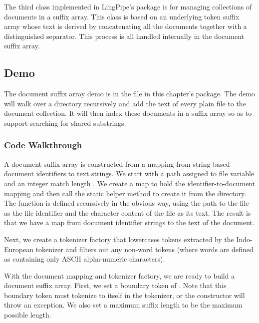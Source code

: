 The third class implemented in LingPipe's  package
is for managing collections of documents in a suffix array.  This
class is based on an underlying token suffix array whose text is
derived by concatenating all the documents together with a distinguished
separator.  This process is all handled internally in the document
suffix array.

\subsection{Demo}

The document suffix array demo is in the file 
in this chapter's package.  The demo will walk over a directory recursively
and add the text of every plain file to the document collection.  It
will then index these documents in a suffix array so as to support
searching for shared substrings.

\subsubsection{Code Walkthrough}

A document suffix array is constructed from a mapping from
string-based document identifiers to text strings.  We start
with a path assigned to file variable  and an integer
match length .  We create a map to hold the
identifier-to-document mapping and then call the static helper
method  to create it from the directory.
%
%
The  function is defined recursively in the
obvious way, using the path to the file as the file identifier
and the character content of the file as its text.
%
%
The result is that we have a map from document identifier strings
to the text of the document.

Next, we create a tokenizer factory that lowercases tokens extracted
by the Indo-European tokenizer and filters out any non-word
tokens (where words are defined as containing only ASCII alpha-numeric
characters).
%

With the document mapping and tokenizer factory, we are ready to
build a document suffix array.
%
%
First, we set a boundary token of .  Note that this
boundary token must tokenize to itself in the tokenizer, or the
constructor will throw an exception.  We also set a maximum suffix
length to be the maximum possible length.

